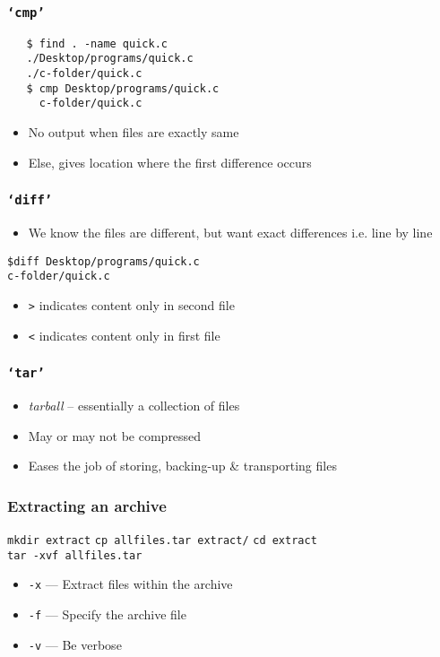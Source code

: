 \documentclass[17pt,compress]{beamer}
\begin{document}
\begin{frame}[fragile]
  \frametitle{\texttt{`cmp'}}
  \begin{lstlisting}
   $ find . -name quick.c
   ./Desktop/programs/quick.c
   ./c-folder/quick.c
   $ cmp Desktop/programs/quick.c 
     c-folder/quick.c
  \end{lstlisting} %
  \begin{itemize}
  \item No output when files are exactly same
  \item Else, gives location where the first difference occurs 
  \end{itemize}
\end{frame}

\begin{frame}[fragile]
  \frametitle{\texttt{`diff'}}
  \begin{itemize}
  \item We know the files are different, but want exact differences i.e. line by line
  \end{itemize}
\hspace{30pt}\verb~$diff Desktop/programs/quick.c ~\\
\hspace{40pt}\verb~c-folder/quick.c~
 
  \begin{itemize}
  \item \texttt{>} indicates content only in second file
  \item \texttt{<} indicates content only in first file
  \end{itemize}
\end{frame}

\begin{frame}[fragile]
\frametitle{\texttt{`tar'}}
\begin{itemize}
\item \emph{tarball} -- essentially a collection of files
\item May or may not be compressed
\item Eases the job of storing, backing-up \& transporting files
\end{itemize}
\end{frame}

\begin{frame}[fragile]
\frametitle{Extracting an archive}
\verb~mkdir extract~
\verb~cp allfiles.tar extract/~
\verb~cd extract~\\
\verb~tar -xvf allfiles.tar~


\begin{itemize}
\item \texttt{-x} --- Extract files within the archive
\item \texttt{-f} --- Specify the archive file
\item \texttt{-v} --- Be verbose
\end{itemize}
\end{frame}
\end{document}
